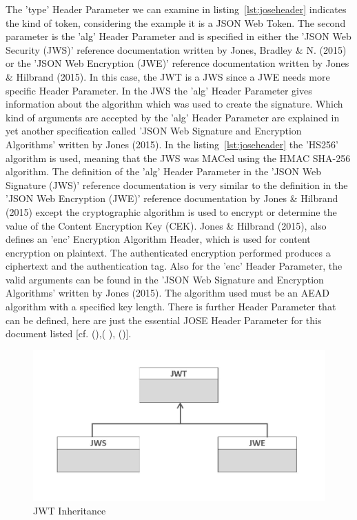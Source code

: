 The 'type' Header Parameter we can examine in listing~\ref{lst:joseheader} indicates the kind of token, considering the example it is a JSON Web Token. The second parameter is the 'alg' Header Parameter and is specified in either the 'JSON Web Security (JWS)' reference documentation written by Jones, Bradley \& N. (2015) or the 'JSON Web Encryption (JWE)' reference documentation written by Jones \& Hilbrand (2015). In this case, the JWT is a JWS since a JWE needs more specific Header Parameter. In the JWS the 'alg' Header Parameter gives information about the algorithm which was used to create the signature. Which kind of arguments are accepted by the 'alg' Header Parameter are explained in yet another specification called 'JSON Web Signature and Encryption Algorithms' written by Jones (2015). In the listing~\ref{lst:joseheader} the 'HS256' algorithm is used, meaning that the JWS was MACed using the HMAC SHA-256 algorithm. The definition of the 'alg' Header Parameter in the 'JSON Web Signature (JWS)' reference documentation is very similar to the definition in the 'JSON Web Encryption (JWE)' reference documentation by Jones \& Hilbrand (2015) except the cryptographic algorithm is used to encrypt or determine the value of the Content Encryption Key (CEK). Jones \& Hilbrand (2015), also defines an 'enc' Encryption Algorithm Header, which is used for content encryption on plaintext. The authenticated encryption performed produces a ciphertext and the authentication tag. Also for the 'enc' Header Parameter, the valid arguments can be found in the 'JSON Web Signature and Encryption Algorithms' written by Jones (2015). The algorithm used must be an AEAD algorithm with a specified key length. There is further Header Parameter that can be defined, here are just the essential JOSE Header Parameter for this document listed [cf. (\cite{JWE:IETF:Jones:2015}),( \cite{JWA:Jones:2015}), (\cite{JWS:IETF:Jones:2015})]. 

\begin{figure}[h]
	\centering
	\includegraphics[width=0.8\linewidth]{images/jwtjwsjwe2}
	\caption{JWT Inheritance}
	\label{fig:jwtjwsjwe2}
\end{figure}

